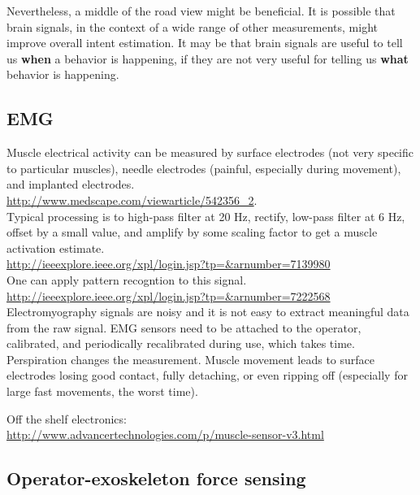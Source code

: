 \documentclass[letterpaper,12pt,fullpage]{article}
\begin{document}
Nevertheless, a middle of the road view might be beneficial. It is possible
that brain signals,
in the context of a wide range of other measurements,
might improve overall intent estimation.
It may be that brain signals are useful to tell us {\bf when} a behavior
is happening, if they are not very useful for telling us {\bf what}
behavior is happening.

\subsection{EMG}

Muscle electrical activity can be measured by surface electrodes
(not very specific to particular muscles), needle electrodes (painful,
especially during movement), and implanted electrodes.\\
\url{http://www.medscape.com/viewarticle/542356_2}.\\
Typical processing is to 
high-pass filter at 20 Hz, rectify, low-pass filter at 6 Hz,
offset by a small value, and amplify by some scaling factor
to get a muscle activation estimate.\\
\url{http://ieeexplore.ieee.org/xpl/login.jsp?tp=&arnumber=7139980}\\
One can apply pattern recogntion to this signal.\\
\url{http://ieeexplore.ieee.org/xpl/login.jsp?tp=&arnumber=7222568}\\

Electromyography 
signals are noisy and it is not easy to extract
meaningful data from the raw signal. 
EMG sensors
need to be attached to the operator, calibrated,
and periodically recalibrated during use, which takes time.
Perspiration changes the measurement. 
Muscle movement leads to surface electrodes losing good contact,
fully detaching, or
even ripping off (especially for large fast
movements, the worst time).

Off the shelf electronics:\\
\url{http://www.advancertechnologies.com/p/muscle-sensor-v3.html}

\subsection{Operator-exoskeleton force sensing}
\end{document}
